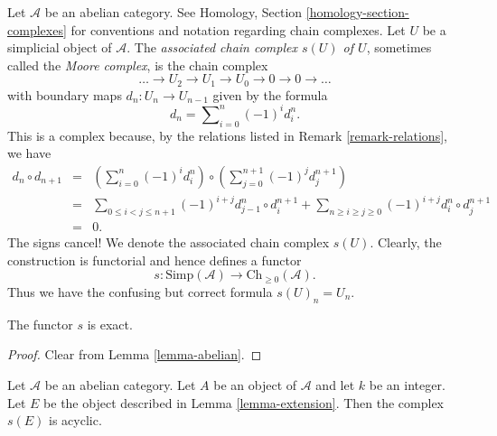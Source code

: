 \noindent
Let $\mathcal{A}$ be an abelian category. See
Homology, Section \ref{homology-section-complexes}
for conventions and notation regarding chain
complexes.
Let $U$ be a simplicial object of $\mathcal{A}$.
The {\it associated chain complex $s(U)$ of $U$},
sometimes called the {\it Moore complex}, is
the chain complex
$$
\ldots \to U_2 \to U_1 \to U_0 \to 0 \to 0 \to \ldots
$$
with boundary maps $d_n : U_n \to U_{n - 1}$
given by the formula
$$
d_n = \sum\nolimits_{i = 0}^n (-1)^i d^n_i.
$$
This is a complex because, by the relations listed
in Remark \ref{remark-relations}, we have
\begin{eqnarray*}
d_n \circ d_{n + 1}
& = &
(\sum\nolimits_{i = 0}^n (-1)^i d^n_i) \circ
(\sum\nolimits_{j = 0}^{n + 1} (-1)^j d^{n + 1}_j) \\
& = &
\sum\nolimits_{0 \leq i < j \leq n + 1}
(-1)^{i + j} d^n_{j - 1} \circ d^{n + 1}_i
+
\sum\nolimits_{n \geq i \geq j \geq 0}
(-1)^{i + j} d^n_i \circ d^{n + 1}_j \\
& = & 0.
\end{eqnarray*}
The signs cancel! We denote the associated chain complex
$s(U)$. Clearly, the construction is functorial
and hence defines a functor
$$
s : \text{Simp}(\mathcal{A}) \longrightarrow \text{Ch}_{\geq 0}(\mathcal{A}).
$$
Thus we have the confusing but correct formula $s(U)_n = U_n$.

\begin{lemma}
\label{lemma-s-exact}
The functor $s$ is exact.
\end{lemma}

\begin{proof}
Clear from Lemma \ref{lemma-abelian}.
\end{proof}

\begin{lemma}
\label{lemma-homology-extension}
Let $\mathcal{A}$ be an abelian category.
Let $A$ be an object of $\mathcal{A}$ and
let $k$ be an integer. Let $E$ be the object
described in Lemma \ref{lemma-extension}.
Then the complex $s(E)$ is acyclic.
\end{lemma}

